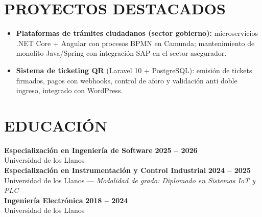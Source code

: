 \documentclass[letterpaper,10pt]{article}
\begin{document}
\section{PROYECTOS DESTACADOS}
\begin{itemize}
    \item \textbf{Plataformas de trámites ciudadanos (sector gobierno):} microservicios .NET Core + Angular con procesos BPMN en Camunda; mantenimiento de monolito Java/Spring con integración SAP en el sector asegurador.
    \item \textbf{Sistema de ticketing QR} (Laravel 10 + PostgreSQL): emisión de tickets firmados, pagos con webhooks, control de aforo y validación anti doble ingreso, integrado con WordPress.
\end{itemize}

\section{EDUCACIÓN}
\textbf{Especialización en Ingeniería de Software} \hfill \textbf{2025 -- 2026} \\
Universidad de los Llanos \\
\textbf{Especialización en Instrumentación y Control Industrial} \hfill \textbf{2024 -- 2025} \\
Universidad de los Llanos --- \textit{Modalidad de grado: Diplomado en Sistemas IoT y PLC} \\
\textbf{Ingeniería Electrónica} \hfill \textbf{2018 -- 2024} \\
Universidad de los Llanos

\end{document}
